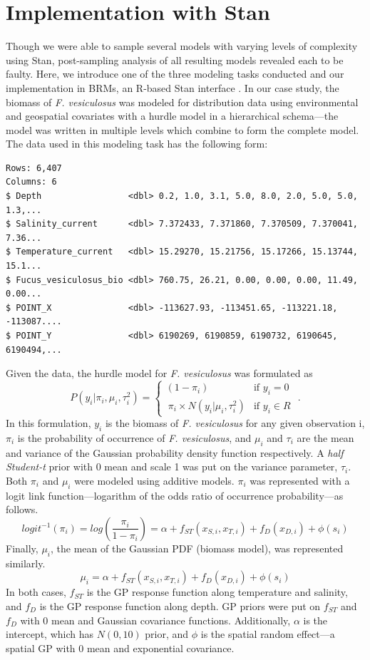 \documentclass[
  12pt,
  twoside]{book}
\theoremstyle{definition}
\theoremstyle{definition}
\theoremstyle{definition}
\theoremstyle{remark}
\begin{document}
\hypertarget{implementation-with-stan}{%
\section{Implementation with Stan}\label{implementation-with-stan}}

Though we were able to sample several models with varying levels of complexity using Stan, post-sampling analysis of all resulting models revealed each to be faulty.
Here, we introduce one of the three modeling tasks \citet{Kotta2019} conducted and our implementation in BRMs, an R-based Stan interface \citep{Burkner2017}.
In our case study, the biomass of \emph{F. vesiculosus} was modeled for distribution data using environmental and geospatial covariates with a hurdle model in a hierarchical schema---the model was written in multiple levels which combine to form the complete model.
The data used in this modeling task has the following form:

\begin{verbatim}
Rows: 6,407
Columns: 6
$ Depth                 <dbl> 0.2, 1.0, 3.1, 5.0, 8.0, 2.0, 5.0, 5.0, 1.3,...
$ Salinity_current      <dbl> 7.372433, 7.371860, 7.370509, 7.370041, 7.36...
$ Temperature_current   <dbl> 15.29270, 15.21756, 15.17266, 15.13744, 15.1...
$ Fucus_vesiculosus_bio <dbl> 760.75, 26.21, 0.00, 0.00, 0.00, 11.49, 0.00...
$ POINT_X               <dbl> -113627.93, -113451.65, -113221.18, -113087....
$ POINT_Y               <dbl> 6190269, 6190859, 6190732, 6190645, 6190494,...
\end{verbatim}

Given the data, the hurdle model for \emph{F. vesiculosus} was formulated as
\[P(y_i|\pi_i,\mu_i,\tau_i^2)= \begin{cases}(1-\pi_i) & \textrm{if }y_i=0\\\ \pi_i \times N(y_i|\mu_i,\tau_i^2) & \textrm{if }y_i \in R\end{cases}\textrm{ .}\]
In this formulation, \(y_i\) is the biomass of \emph{F. vesiculosus} for any given observation i, \(\pi_i\) is the probability of occurrence of \emph{F. vesiculosus}, and \(\mu_i\) and \(\tau_i\) are the mean and variance of the Gaussian probability density function respectively.
A \emph{half Student-t} prior with 0 mean and scale 1 was put on the variance parameter, \(\tau_i\).
Both \(\pi_i\) and \(\mu_i\) were modeled using additive models.
\(\pi_i\) was represented with a logit link function---logarithm of the odds ratio of occurrence probability---as follows.
\[logit^{-1}(\pi_i)=log( \frac{\pi_i}{1-\pi_i})=\alpha+f_{ST}(x_{S,i},x_{T,i})+f_D(x_{D,i})+ \phi(s_i)\]
Finally, \(\mu_i\), the mean of the Gaussian PDF (biomass model), was represented similarly.
\[\mu_i= \alpha+f_{ST}(x_{S,i},x_{T,i})+f_D(x_{D,i})+ \phi(s_i)\]
In both cases, \(f_{ST}\) is the GP response function along temperature and salinity, and \(f_{D}\) is the GP response function along depth.
GP priors were put on \(f_{ST}\) and \(f_{D}\) with 0 mean and Gaussian covariance functions.
Additionally, \(\alpha\) is the intercept, which has \(N(0,10)\) prior, and \(\phi\) is the spatial random effect---a spatial GP with 0 mean and exponential covariance.
\end{document}
